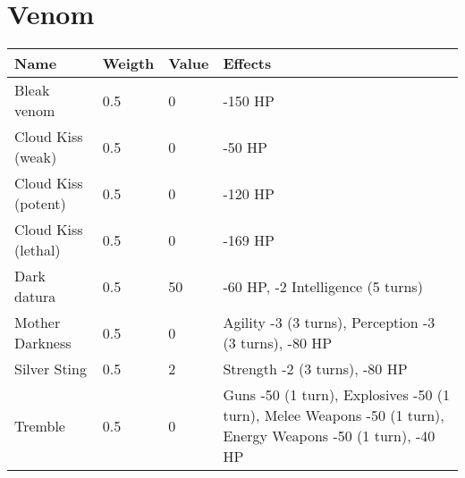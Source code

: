 \documentclass{report}
\begin{document}
\begin{table}[H]
\begin{table}[H]
\begin{table}[H]
\begin{table}[H]
\begin{table}[H]
\begin{table}[H]
\begin{table}[H]
\begin{table}[H]
\begin{table}[H]
\begin{table}[H]
\begin{table}[H]
\begin{table}[H]
\begin{table}[H]
\begin{table}[H]
\begin{table}[H]
\begin{table}[H]
\chapter{Venom}
\begin{table}[H]
  \centering
  \begin{tabular}{p{30mm}p{30mm}p{30mm}p{30mm}}
\bfseries Name & \bfseries Weigth & \bfseries Value & \bfseries Effects \\
\hline
Bleak venom  & 0.5  & 0 & -150 HP \\
Cloud Kiss (weak)  & 0.5  & 0 & -50 HP \\
Cloud Kiss (potent)  & 0.5  & 0 & -120 HP \\
Cloud Kiss (lethal)  & 0.5  & 0 & -169 HP \\
Dark datura  & 0.5  & 50 & -60 HP, -2 Intelligence (5 turns)  \\
Mother Darkness  & 0.5  & 0 & Agility -3 (3 turns), Perception -3 (3 turns), -80 HP \\
Silver Sting  & 0.5  & 2 & Strength -2 (3 turns), -80 HP  \\
Tremble  & 0.5  & 0 & Guns -50 (1 turn), Explosives -50 (1 turn), Melee Weapons -50 (1 turn), Energy Weapons -50 (1 turn), -40 HP \\
  \end{tabular}

\end{table}
\end{table}
\end{table}
\end{table}
\end{table}
\end{table}
\end{table}
\end{table}
\end{table}
\end{table}
\end{table}
\end{table}
\end{table}
\end{table}
\end{table}
\end{table}
\end{table}
\end{document}
